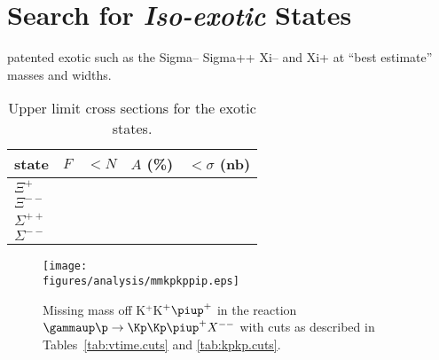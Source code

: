 \section{\label{sec:results.exotics}Search for \emph{Iso-exotic} States}

patented exotic such as the Sigma-- Sigma++ Xi-- and Xi+ at ``best estimate'' masses and widths.

\begin{table}
\begin{minipage}{\textwidth}
\begin{center}
\begin{singlespacing}
\caption[Exotic States Upper Limits]{\label{tab:exotic.ulimits}Upper limit cross sections for the exotic states.}
\begin{tabular}{lcccc}
\hline \hline
state & $F$ & $<N$ & $A$ (\%) & $<\sigma$ (nb) \\
\hline
$\Xi^+$       &  & \\
$\Xi^{--}$    &  & \\
$\Sigma^{++}$ &  &  \\
$\Sigma^{--}$ &  &  \\
\hline \hline
\end{tabular}
\end{singlespacing}
\end{center}
\end{minipage}
\end{table}


\begin{figure}[bh]\begin{center}
    \texttt{[image: \\figures/analysis/mmkpkppip.eps]}
    \caption[MM(K$^{+}$K$^{+}\piup^+$)]{\label{fig:mmkpkppip}Missing mass off K$^{+}$K$^{+}\piup^+$ in the reaction $\gammaup \p \rightarrow \Kp \Kp \piup^+ X^{--}$ with cuts as described in Tables~\ref{tab:vtime.cuts} and \ref{tab:kpkp.cuts}.}
\end{center}\end{figure}

\clearpage
